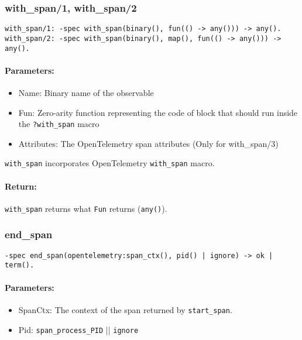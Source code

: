         \subsubsection{with\_span/1, with\_span/2}
        
        \begin{verbatim}
with_span/1: -spec with_span(binary(), fun(() -> any())) -> any().
with_span/2: -spec with_span(binary(), map(), fun(() -> any())) -> any().
        \end{verbatim}
         
        \paragraph{Parameters:}
            \begin{itemize}
                \item Name: Binary name of the observable
                \item Fun: Zero-arity function representing the code of block that should run inside the \texttt{?with\_span} macro
                \item Attributes: The OpenTelemetry span attributes (Only for with\_span/3)
            \end{itemize}

        \texttt{with\_span} incorporates OpenTelemetry \texttt{with\_span} macro. \\
        \paragraph{Return:}
            \texttt{with\_span} returns what \texttt{Fun} returns (\texttt{any()}).
        
        \subsubsection{end\_span}
            \begin{verbatim}                
-spec end_span(opentelemetry:span_ctx(), pid() | ignore) -> ok | term().
            \end{verbatim}
            \paragraph{Parameters:}
            \begin{itemize}
                \item SpanCtx: The context of the span returned by \texttt{start\_span}.
                \item Pid: \texttt{span\_process\_PID} || \texttt{ignore}
            \end{itemize}

